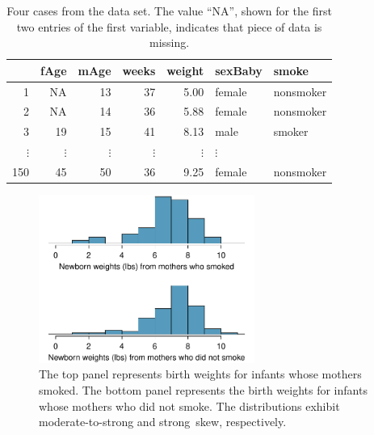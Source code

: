 {\begin{table}[h]
\centering
\begin{tabular}{rrrrrll}
  \hline
 & fAge & mAge & weeks & weight & sexBaby & smoke \\ 
  \hline
1 & NA & 13 &  37 & 5.00 & female & nonsmoker \\ 
  2 & NA & 14 &  36 & 5.88 & female & nonsmoker \\ 
  3 & 19 & 15 &  41 & 8.13 & male & smoker \\ 
  $\vdots$ &   $\vdots$ &   $\vdots$ &   $\vdots$ &   $\vdots$ &   $\vdots$ \\
  150 & 45 & 50 &  36 & 9.25 & female & nonsmoker \\ 
   \hline
\end{tabular}
\caption{Four cases from the  data set. The value ``NA'', shown for the first two entries of the first variable, indicates that piece of data is missing.\textC{-2mm}}
\label{babySmokeDF}
\end{table}

\begin{figure}[hhh]
\centering
\includegraphics[width=0.63\textwidth]{ch_inference_for_means/figures/babySmokePlotOfTwoGroupsToExamineSkew/babySmokePlotOfTwoGroupsToExamineSkew}
\caption{The top panel represents birth weights for infants whose mothers smoked. The bottom panel represents the birth weights for infants whose mothers who did not smoke. The distributions exhibit moderate-to-strong and strong~skew, respectively.}
\label{babySmokePlotOfTwoGroupsToExamineSkew}
\end{figure}

}
